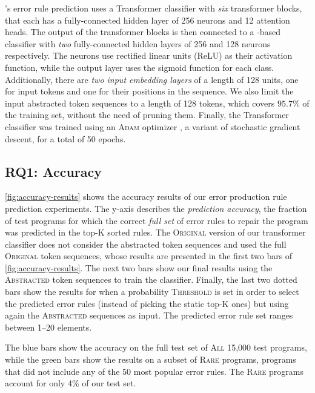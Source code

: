 \toolname's error rule prediction uses a Transformer classifier with \emph{six}
transformer blocks, that each has a fully-connected hidden layer of 256 neurons
and 12 attention heads. The output of the transformer blocks is then connected
to a \dnn-based classifier with \emph{two} fully-connected hidden layers of 256
and 128 neurons respectively. The neurons use rectified linear units (ReLU) as
their activation function, while the output layer uses the sigmoid function for
each class. Additionally, there are \emph{two input embedding layers} of a
length of 128 units, one for input tokens and one for their positions in the
sequence. We also limit the input abstracted token sequences to a length of 128
tokens, which covers $95.7\%$ of the training set, without the need of pruning
them. Finally, the Transformer classifier was trained using an \textsc{Adam}
optimizer \citep{Kingma2014-ng}, a variant of stochastic gradient descent, for a
total of 50 epochs.

\subsection{RQ1: Accuracy}
\label{sec:eval:accuracy}



%
\autoref{fig:accuracy-results} shows the accuracy results of our error
production rule prediction experiments. The y-axis describes the
\emph{prediction accuracy}, \ie the fraction of test programs for which the
correct \emph{full set} of error rules to repair the program was predicted in
the top-K sorted rules.
%
The \textsc{Original} version of our transformer classifier does not consider
the abstracted token sequences and used the full \textsc{Original} token
sequences, whose results are presented in the first two bars of
\autoref{fig:accuracy-results}. The next two bars show our final results using
the \textsc{Abstracted} token sequences to train the classifier. Finally, the
last two dotted bars show the results for when a probability \textsc{Threshold}
is set in order to select the predicted error rules (instead of picking the
static top-K ones) but using again the \textsc{Abstracted} sequences as input.
The predicted error rule set ranges between 1--20 elements.

The blue bars show the accuracy on the full test set of \textsc{All} 15,000 test
programs, while the green bars show the results on a subset of \textsc{Rare}
programs, \ie programs that did not include any of the 50 most popular error
rules. The \textsc{Rare} programs account for only 4\% of our test set.

